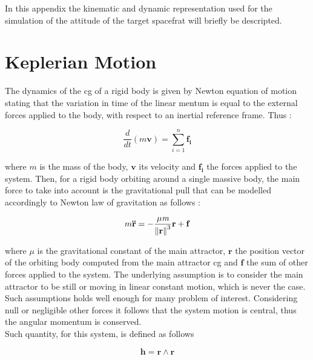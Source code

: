 In this appendix the kinematic and dynamic representation used for the simulation of the attitude of the target spacefrat will briefly be descripted.

\section{Keplerian Motion}
The dynamics of the \acrshort{cg} of a rigid body is given by Newton equation of motion stating that the variation in time of the linear mentum is equal to the external forces applied to the body, with respect to an inertial reference frame. Thus :

\begin{equation}
  \frac{d}{dt} (\textit{m} \mathbf{v}) = \sum\limits_{i=1}^n \mathbf{f_i}
\end{equation}

where $\textit{m}$ is the mass of the body, $\mathbf{v}$ its velocity and $\mathbf{f_i}$ the forces applied to the system. Then, for a rigid body orbiting around a single massive body, the main force to take into account is the gravitational pull that can be modelled accordingly to Newton law of gravitation as follows :

\begin{equation}
  \label{eqn:orbiteqtn}
  m \mathbf{\ddot{r}} = - \frac{\mu \textit{m}} {\left\lVert\mathbf{r}\right\rVert^3} \mathbf{r} + \mathbf{f}
\end{equation}

where $\mu$ is the gravitational constant of the main attractor, $\mathbf{r}$ the position vector of the orbiting body computed from the main attractor \acrshort{cg} and $\mathbf{f}$ the sum of other forces applied to the system. The underlying assumption is to consider the main attractor to be still or moving in linear constant motion, which is never the case. Such assumptions holds well enough for many problem of interest. Considering null or negligible other forces it follows that the system motion is central, thus the angular momentum is conserved.\\
Such quantity, for this system, is defined as follows

\begin{equation}
  \mathbf{h} = \mathbf{r} \wedge \mathbf{r}
\end{equation}

